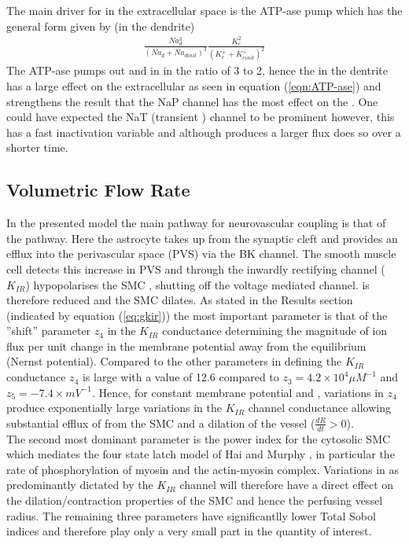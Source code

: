 The main driver for \pot in the extracellular space is the \pot \na ATP-ase pump which has the general form given by (in the dendrite)  
\begin{eqnarray}\label{eqn:ATP-ase}
\frac{Na_d^3}{\left( Na_d+Na_{d init}\right)^3}\frac{K^{2}_e}{\left( K^+_e +K^+_{e init}\right) ^2}
\end{eqnarray}
The ATP-ase pumps out \na and in \pot in the ratio of 3 to 2, hence the \na in the dentrite has a large effect on the extracellular \pot as seen in equation (\ref{eqn:ATP-ase}) and strengthens the result that the NaP channel has the most effect on the \pot. One could have expected the NaT (transient \na) channel to be prominent however, this has a fast inactivation variable and although produces a larger flux does so over a shorter time.  
\subsection{Volumetric Flow Rate}
In the presented model the main pathway for neurovascular coupling is that of the \pot pathway. Here the astrocyte takes up \pot from the synaptic cleft and provides an efflux into the perivascular space (PVS) via the BK channel. The smooth muscle cell detects this increase in PVS \pot and through the inwardly rectifying channel ($K_{IR}$) hypopolarises the SMC , shutting off the voltage mediated \ca channel.  \ca is therefore reduced and the SMC dilates. As stated in the Results section (indicated by equation (\ref{eq:gkir})) the most important parameter is that of the ''shift'' parameter $z_4$ in the $K_{IR}$ conductance determining the magnitude of ion flux per unit change in the membrane potential away from the equilibrium (Nernst potential).  Compared to the other parameters in defining the $K_{IR}$ conductance $z_4$ is large with a value of 12.6 compared to $z_3=4.2 \times 10^{4} \mu M^{-1}$ and $z_5 = -7.4 \times mV^{-1}$. Hence, for constant membrane potential and \pot,   variations in $z_4$ produce exponentially large variations in the $K_{IR}$ channel conductance allowing substantial efflux of \ca from the SMC and a dilation of the vessel ($\frac{dR}{dt}> 0$). \\

The second most dominant parameter is the power index for the cytosolic SMC \ca which mediates the four state latch model of Hai and Murphy \cite{Hai1988}, in particular the rate of phosphorylation of  myosin and the actin-myosin complex.  Variations in \ca as predominantly dictated by the $K_{IR}$ channel will therefore have a direct effect on the dilation/contraction properties of the SMC and hence the perfusing vessel radius.  
The remaining three parameters have significantlly lower Total Sobol indices and therefore play only a very small part in the quantity of interest.\\
 
